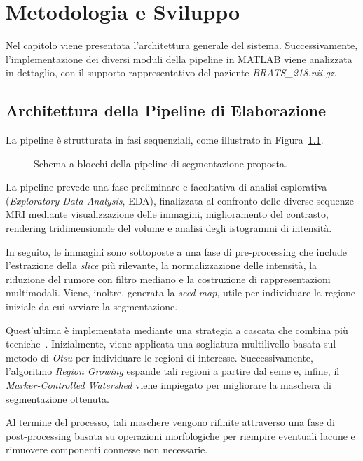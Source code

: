 \chapter{Metodologia e Sviluppo}
Nel capitolo viene presentata l’architettura generale del sistema. Successivamente, l'implementazione dei diversi moduli della pipeline in MATLAB viene analizzata in dettaglio, con il supporto rappresentativo del paziente \textit{BRATS\_218.nii.gz}.

\section{Architettura della Pipeline di Elaborazione}
La pipeline è strutturata in fasi sequenziali, come illustrato in Figura~\ref{fig:pipeline}.

\begin{figure}[h]
    \centering
    
    \caption{Schema a blocchi della pipeline di segmentazione proposta.}
    \label{fig:pipeline}
\end{figure}

La pipeline prevede una fase preliminare e facoltativa di analisi esplorativa (\textit{Exploratory Data Analysis}, EDA), finalizzata al confronto delle diverse sequenze MRI mediante visualizzazione delle immagini, miglioramento del contrasto, rendering tridimensionale del volume e analisi degli istogrammi di intensità.

In seguito, le immagini sono sottoposte a una fase di pre-processing che include l’estrazione della \textit{slice} più rilevante, la normalizzazione delle intensità, la riduzione del rumore con filtro mediano e la costruzione di rappresentazioni multimodali. Viene, inoltre, generata la \textit{seed map}, utile per individuare la regione iniziale da cui avviare la segmentazione.

Quest'ultima è implementata mediante una strategia a cascata che combina più tecniche~\cite{peter2008}. Inizialmente, viene applicata una sogliatura multilivello basata sul metodo di \textit{Otsu} per individuare le regioni di interesse. Successivamente, l'algoritmo \textit{Region Growing} espande tali regioni a partire dal seme e, infine, il \textit{Marker-Controlled Watershed} viene impiegato per migliorare la maschera di segmentazione ottenuta.

Al termine del processo, tali maschere vengono rifinite attraverso una fase di post-processing basata su operazioni morfologiche per riempire eventuali lacune e rimuovere componenti connesse non necessarie.

